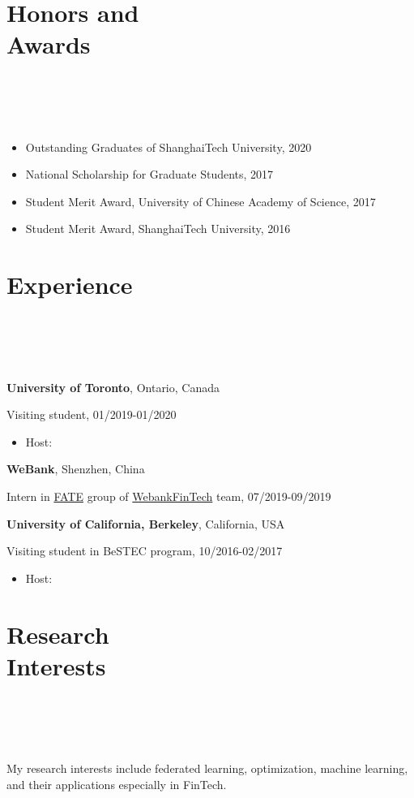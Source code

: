 \documentclass{article}
\newcommand{\homepage}[3][homepagecolor]{\href{#2}{\color{#1}{#3}}}
\begin{document}
\section*{\colorbox{mygrey}{Honors and Awards~~~~~~~~~~~~~~~~~~~~~~~~~~~~~~~~~~~~~~~~~~~~~~~~~~~~~~~~~~~~~~~~~~~~~~~~~~~~~~}}
\begin{itemize}
\item Outstanding Graduates of ShanghaiTech University, 2020
\item National Scholarship for Graduate Students, 2017
\item Student Merit Award, University of Chinese Academy of Science, 2017
\item Student Merit Award, ShanghaiTech University, 2016
\end{itemize}

\section*{\colorbox{mygrey}{Experience~~~~~~~~~~~~~~~~~~~~~~~~~~~~~~~~~~~~~~~~~~~~~~~~~~~~~~~~~~~~~~~~~~~~~~~~~~~~~}}
{\bf{University of Toronto}}, Ontario, Canada

Visiting student, 01/2019-01/2020
\begin{itemize}
\item Host: \homepage{https://www.comm.utoronto.ca/~weiyu/}{Prof. Wei Yu}
\end{itemize}
\vspace{1em}
{\bf{WeBank}}, Shenzhen, China

Intern in \href{https://fate.fedai.org}{FATE} group of \href{https://github.com/WeBankFinTech}{WebankFinTech} team, 07/2019-09/2019

\vspace{1em}
{\bf{University of California, Berkeley}}, California, USA

Visiting student in BeSTEC program, 10/2016-02/2017
\begin{itemize}
\item Host: \homepage{https://people.eecs.berkeley.edu/~wainwrig/}{Prof. Martin J. Wainwright}
\end{itemize}


\section*{\colorbox{mygrey}{Research Interests~~~~~~~~~~~~~~~~~~~~~~~~~~~~~~~~~~~~~~~~~~~~~~~~~~~~~~~~~~~~~~~~~~~~~~~~~~~~~~~}}
My research interests include federated learning, optimization, machine learning, and their applications especially in FinTech.
\end{document}
